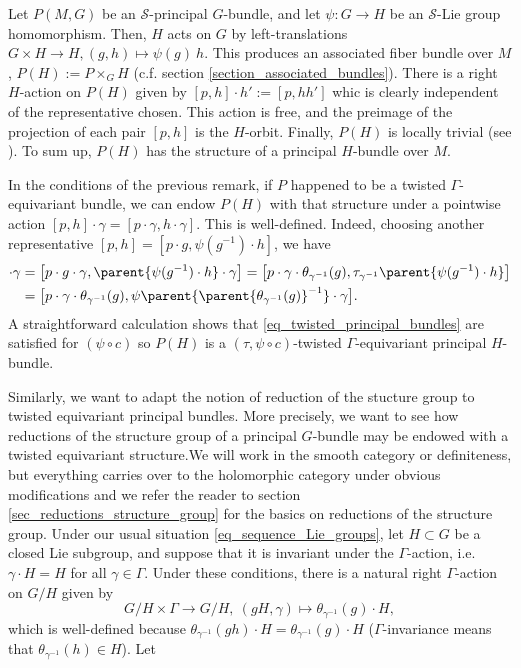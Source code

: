 \begin{obs}
    Let \(P(M,G)\) be an \(\mathcal{S}\)-principal \(G\)-bundle, and let \(\psi\colon G \to H\) be an \(\mathcal{S}\)-Lie group homomorphism. Then, \(H\) acts on \(G\) by left-translations \(G \times H \to H, (g,h) \mapsto \psi(g) \ h\). This produces an associated fiber bundle over \(M\), \(P(H):=P \times_GH\) (c.f. section \ref{section_associated_bundles}). There is a right \(H\)-action on \(P(H)\) given by \([p, h]\cdot h':=[p, hh']\) whic is clearly independent of the representative chosen. This action is free, and the preimage of the projection of each pair \([p,h]\) is the \(H\)-orbit. Finally, \(P(H)\) is locally trivial (see \parencite[Sec. 10.8]{taubes2011differential}). To sum up, \(P(H)\) has the structure of a principal \(H\)-bundle over \(M\). 
\end{obs}

In the conditions of the previous remark, if \(P\) happened to be a twisted \(\Gamma\)-equivariant bundle, we can endow \(P(H)\) with that structure under a pointwise action \([p,h]\cdot \gamma = [p\cdot \gamma, h \cdot \gamma]\). This is well-defined. Indeed, choosing another representative \([p,h]=[p\cdot g, \psi(g^{-1})\cdot h]\), we have
\begin{align*}
[p\cdot g, \psi(g^{-1})\cdot h]\cdot \gamma & = \big[p\cdot g \cdot \gamma, \parent{\psi(g^{-1})\cdot h}\cdot \gamma\big] = \big[p \cdot \gamma \cdot \theta_{\gamma^{-1}}(g), \tau_{\gamma^{-1}}\parent{\psi(g^{-1})\cdot h}\big]\\ 
&=\big[p \cdot \gamma \cdot \theta_{\gamma^{-1}}(g), \psi\parent{\parent{\theta_{\gamma^{-1}}(g)}^{-1}}\cdot \gamma\big].
\end{align*}
A straightforward calculation shows that \eqref{eq_twisted_principal_bundles} are satisfied for \((\psi \circ c)\) so \(P(H)\) is a \((\tau, \psi \circ c)\)-twisted \(\Gamma\)-equivariant principal \(H\)-bundle. \newline \newline

Similarly, we want to adapt the notion of reduction of the stucture group to twisted equivariant principal bundles. More precisely, we want to see how reductions of the structure group of a principal \(G\)-bundle may be endowed with a twisted equivariant structure.We will work in the smooth category or definiteness, but everything carries over to the holomorphic category under obvious modifications and we refer the reader to section \ref{sec_reductions_structure_group} for the basics on reductions of the structure group. Under our usual situation \eqref{eq_sequence_Lie_groups}, let \(H \subset G\) be a closed Lie subgroup, and suppose that it is invariant under the \(\Gamma\)-action, i.e. \(\gamma\cdot H=H\) for all \(\gamma\in \Gamma\). Under these conditions, there is a natural right \(\Gamma\)-action on \(G/H\) given by
\[
G/H \times \Gamma \to G/H, \ (gH, \gamma) \mapsto \theta_{\gamma^{-1}}(g)\cdot H,
\]
which is well-defined because \(\theta_{\gamma^{-1}}(gh)\cdot H = \theta_{\gamma^{-1}}(g)\cdot H\) (\(\Gamma\)-invariance means that \(\theta_{\gamma^{-1}}(h)\in H\)). Let 

